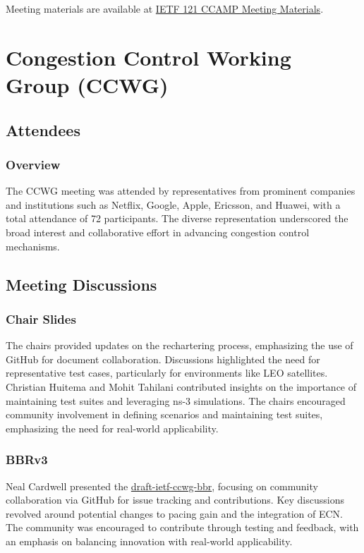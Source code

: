 \documentclass{article}
\begin{document}
Meeting materials are available at \href{https://datatracker.ietf.org/meeting/121/materials/agenda-121-ccamp}{IETF 121 CCAMP Meeting Materials}.



\newpage

\section{Congestion Control Working Group (CCWG)}

\subsection{Attendees}

\subsubsection{Overview}
The CCWG meeting was attended by representatives from prominent companies and institutions such as Netflix, Google, Apple, Ericsson, and Huawei, with a total attendance of 72 participants. The diverse representation underscored the broad interest and collaborative effort in advancing congestion control mechanisms.

\subsection{Meeting Discussions}

\subsubsection{Chair Slides}
The chairs provided updates on the rechartering process, emphasizing the use of GitHub for document collaboration. Discussions highlighted the need for representative test cases, particularly for environments like LEO satellites. Christian Huitema and Mohit Tahilani contributed insights on the importance of maintaining test suites and leveraging ns-3 simulations. The chairs encouraged community involvement in defining scenarios and maintaining test suites, emphasizing the need for real-world applicability.

\subsubsection{BBRv3}
Neal Cardwell presented the \href{https://datatracker.ietf.org/doc/html/draft-ietf-ccwg-bbr}{draft-ietf-ccwg-bbr}, focusing on community collaboration via GitHub for issue tracking and contributions. Key discussions revolved around potential changes to pacing gain and the integration of ECN. The community was encouraged to contribute through testing and feedback, with an emphasis on balancing innovation with real-world applicability.
\end{document}
